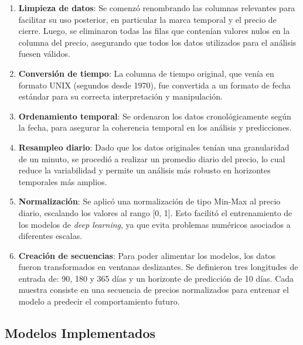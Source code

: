 \documentclass[12pt]{article}
\begin{document}
\begin{enumerate}
\item \textbf{Limpieza de datos}: Se comenzó renombrando las columnas relevantes para facilitar su uso posterior,
en particular la marca temporal y el precio de cierre. Luego, se eliminaron todas las filas que contenían valores nulos en la columna del precio, asegurando que todos los datos utilizados para el análisis fuesen válidos.

\item \textbf{Conversión de tiempo}: La columna de tiempo original, que venía en formato UNIX (segundos desde 1970), fue convertida a un formato de fecha estándar para su correcta interpretación y manipulación.

\item \textbf{Ordenamiento temporal}: Se ordenaron los datos cronológicamente según la fecha, para asegurar la coherencia temporal en los análisis y predicciones.

\item \textbf{Resampleo diario}: Dado que los datos originales tenían una granularidad de un minuto,
se procedió a realizar un promedio diario del precio, lo cual reduce la variabilidad y permite un análisis más robusto en horizontes temporales más amplios.

\item \textbf{Normalización}: Se aplicó una normalización de tipo Min-Max al precio diario, escalando los valores al rango [0, 1].
Esto facilitó el entrenamiento de los modelos de \textit{deep learning}, ya que evita problemas numéricos asociados a diferentes escalas.

\item \textbf{Creación de secuencias}: Para poder alimentar los modelos, los datos fueron transformados en ventanas deslizantes.
Se definieron tres longitudes de entrada de: 90, 180 y 365 días y un horizonte de predicción de 10 días.
Cada muestra consiste en una secuencia de precios normalizados para entrenar el modelo a predecir el comportamiento futuro.
\end{enumerate}


\newpage
\subsection{Modelos Implementados}


\end{document}
